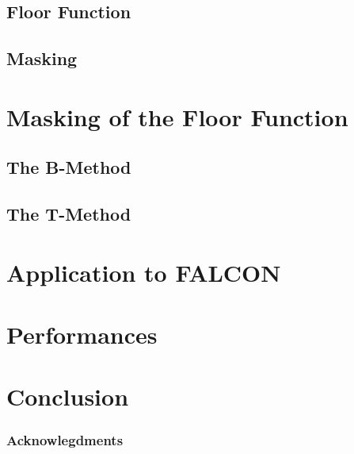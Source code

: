 \documentclass[runningheads]{llncs}
\begin{document}
\subsection{Floor Function}
\subsection{Masking}

\section{Masking of the Floor Function}\label{sec:maskfloor}
\subsection{The B-Method}
\subsection{The T-Method}

\section{Application to FALCON}\label{sec:appfalcon}

\section{Performances}\label{sec:perf}

\section{Conclusion}\label{sec:conclusion}
\subsubsection{Acknowlegdments}

%
%
%
 
 
\end{document}
